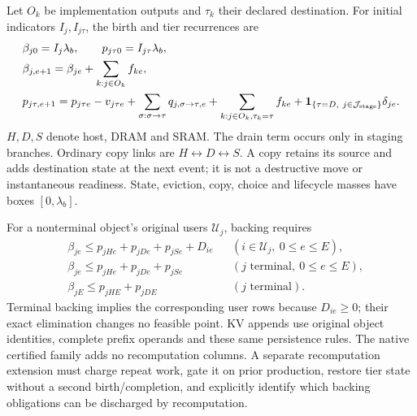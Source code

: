 Let $O_k$ be implementation outputs and $\tau_k$ their declared destination.
For initial indicators $I_j,I_{j\tau}$, the birth and tier recurrences are
\begin{align}
 &\beta_{j0}=I_j\lambda_b,\qquad p_{j\tau0}=I_{j\tau}\lambda_b,\nonumber\\
 &\beta_{j,e+1}=\beta_{je}+\sum_{k:j\in O_k}f_{ke},\nonumber\\
 &p_{j\tau,e+1}=p_{j\tau e}-v_{j\tau e}
   +\sum_{\sigma:\sigma\to\tau}q_{j,\sigma\to\tau,e}
   +\sum_{k:j\in O_k,\tau_k=\tau}f_{ke}
   +{\bf1}_{\{\tau=D,\ j\in\mathcal J_{\rm stage}\}}\delta_{je}.
 \label{eq:native_state}
\end{align}
$H,D,S$ denote host, DRAM and SRAM.
The drain term occurs only in staging branches.
Ordinary copy links are $H\leftrightarrow D\leftrightarrow S$.
A copy retains its source and adds destination state at the next event; it is not a destructive move or instantaneous readiness.
State, eviction, copy, choice and lifecycle masses have boxes $[0,\lambda_b]$.

For a nonterminal object's original users $\mathcal U_j$, backing requires
\begin{align}
 &\beta_{je}\le p_{jHe}+p_{jDe}+p_{jSe}+D_{ie}
           &&(i\in\mathcal U_j,\ 0\le e\le E),\nonumber\\
 &\beta_{je}\le p_{jHe}+p_{jDe}+p_{jSe}
           &&(j\text{ terminal},\ 0\le e\le E),\nonumber\\
 &\beta_{jE}\le p_{jHE}+p_{jDE}
           &&(j\text{ terminal}).
 \label{eq:native_backing}
\end{align}
Terminal backing implies the corresponding user rows because $D_{ie}\ge0$; their exact elimination changes no feasible point.
KV appends use original object identities, complete prefix operands and these same persistence rules.
The native certified family adds no recomputation columns.
A separate recomputation extension must charge repeat work, gate it on prior production, restore tier state without a second birth/completion, and explicitly identify which backing obligations can be discharged by recomputation.


